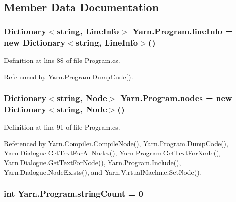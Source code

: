 \subsection{Member Data Documentation}
\hypertarget{a00152_a0d4da395947767b4a1eaaff8a9842adc}{
\subsubsection[{line\-Info}]{\setlength{\rightskip}{0pt plus 5cm}Dictionary$<$string, {\bf Line\-Info}$>$ Yarn.\-Program.\-line\-Info = new Dictionary$<$string, {\bf Line\-Info}$>$()\hspace{0.3cm}{\ttfamily [package]}}}\label{a00152_a0d4da395947767b4a1eaaff8a9842adc}


Definition at line 88 of file Program.\-cs.



Referenced by Yarn.\-Program.\-Dump\-Code().

\hypertarget{a00152_a3f4928a577c88263ad016be259b175c4}{
\subsubsection[{nodes}]{\setlength{\rightskip}{0pt plus 5cm}Dictionary$<$string, {\bf Node}$>$ Yarn.\-Program.\-nodes = new Dictionary$<$string, {\bf Node}$>$()\hspace{0.3cm}{\ttfamily [package]}}}\label{a00152_a3f4928a577c88263ad016be259b175c4}


Definition at line 91 of file Program.\-cs.



Referenced by Yarn.\-Compiler.\-Compile\-Node(), Yarn.\-Program.\-Dump\-Code(), Yarn.\-Dialogue.\-Get\-Text\-For\-All\-Nodes(), Yarn.\-Program.\-Get\-Text\-For\-Node(), Yarn.\-Dialogue.\-Get\-Text\-For\-Node(), Yarn.\-Program.\-Include(), Yarn.\-Dialogue.\-Node\-Exists(), and Yarn.\-Virtual\-Machine.\-Set\-Node().

\hypertarget{a00152_a8ef1d10094ef00311aade6715ba78ec7}{
\subsubsection[{string\-Count}]{\setlength{\rightskip}{0pt plus 5cm}int Yarn.\-Program.\-string\-Count = 0\hspace{0.3cm}{\ttfamily [private]}}}\label{a00152_a8ef1d10094ef00311aade6715ba78ec7}



